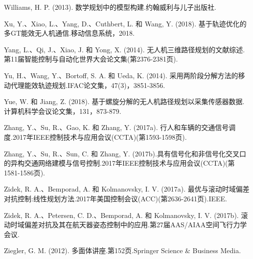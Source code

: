 \documentclass[10pt]{article}
\begin{document}
Williams, H. P. (2013). 数学规划中的模型构建.约翰威利与儿子出版社.

Xu, Y.、Xiao, L.、Yang, D.、Cuthbert, L. 和 Wang, Y. (2018). 基于轨迹优化的多GT能效无人机通信.移动信息系统，2018.

Yang, L.、Qi, J.、Xiao, J. 和 Yong, X. (2014). 无人机三维路径规划的文献综述.第11届智能控制与自动化世界大会论文集(第2376-2381页).

Yu, H.、Wang, Y.、Bortoff, S. A. 和 Ueda, K. (2014). 采用两阶段分解方法的移动代理能效轨迹规划.IFAC论文集，47(3)，3851-3856.

Yue, W. 和 Jiang, Z. (2018). 基于螺旋分解的无人机路径规划以采集传感器数据.计算机科学会议论文集，131，873-879.

Zhang, Y.、Su, R.、Gao, K. 和 Zhang, Y. (2017a). 行人和车辆的交通信号调度.2017年IEEE控制技术与应用会议(CCTA)(第1593-1598页).

Zhang, Y.、Su, R.、Sun, C. 和 Zhang, Y. (2017b).具有信号化和非信号化交叉口的异构交通网络建模与信号控制.2017年IEEE控制技术与应用会议(CCTA)(第1581-1586页).

Zidek, R. A.、Bemporad, A. 和 Kolmanovsky, I. V. (2017a). 最优与滚动时域偏差对抗控制:线性规划方法.2017年美国控制会议(ACC)(第2636-2641页).IEEE.

Zidek, R. A.、Petersen, C. D.、Bemporad, A. 和 Kolmanovsky, I. V. (2017b). 滚动时域偏差对抗及其在航天器姿态控制中的应用.第27届AAS/AIAA空间飞行力学会议.

Ziegler, G. M. (2012). 多面体讲座.第152页.Springer Science \& Business Media.
\end{document}
